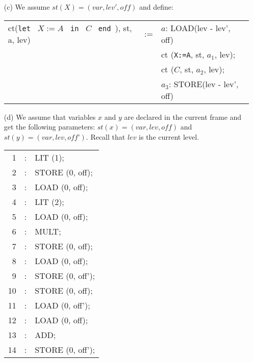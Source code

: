 \begin{solution}
\begin{enumerate}
    \item[(c)] We assume $st(X) = (var, lev', \mathit{off})$ and define: \\
    \begin{tabular}{lcl}
      ct(\texttt{let } $X := A$ \texttt{ in } $C$ \texttt{ end }), st, a, lev)& := & 
              $a$: LOAD(lev - lev', off) \\
          & & ct (\texttt{X:=A}, st, $a_1$, lev); \\
          & & ct (\texttt{$C$}, st, $a_2$, lev);\\
          & & $a_3$: STORE(lev - lev', off)
    \end{tabular}

    \item[(d)] We assume that variables $x$ and $y$ are declared in the current frame and get the following parameters:
      $st(x) = (var, lev, \textit{off})$ and $st(y) = (var, lev, \textit{off'})$. Recall that $lev$ is the current level.
    
    \begin{tabular}{rcl}
    	1 & : \hspace{0.3cm} & LIT (1);\\
    	2 & : \hspace{0.3cm} & STORE (0, off);\\
    	3 & : \hspace{0.3cm} & LOAD (0, off);\\ %
    	4 & : \hspace{0.3cm} & LIT (2);\\
    	5 & : \hspace{0.3cm} & LOAD (0, off); \\
    	6 & : \hspace{0.3cm} & MULT;\\
    	7 & : \hspace{0.3cm} & STORE (0, off);\\ %
    	8 & : \hspace{0.3cm} & LOAD (0, off);\\
    	9 & : \hspace{0.3cm} & STORE (0, off');\\
    	10 & : \hspace{0.3cm} & STORE (0, off);\\ %
    	11 & : \hspace{0.3cm} & LOAD (0, off');\\
    	12 & : \hspace{0.3cm} & LOAD (0, off);\\
    	13 & : \hspace{0.3cm} & ADD;\\
    	14 & : \hspace{0.3cm} & STORE (0, off');\\
    \end{tabular}
  \end{enumerate}
\end{solution}
